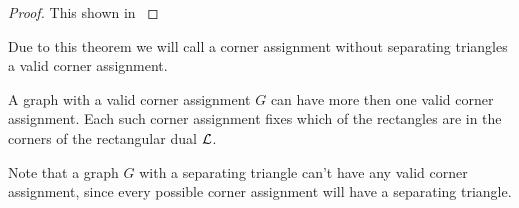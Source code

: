   \begin{proof}
    This shown in \cite{Kozminski1984} 
  \end{proof}

  Due to this theorem we will call a corner assignment without separating triangles a valid corner assignment.

  A graph with a valid corner assignment $G$ can have more then one valid corner assignment. Each such corner assignment fixes which of the rectangles are in the corners of the rectangular dual $\mathcal{L}$.

  Note that a graph $G$ with a separating triangle can't have any valid corner assignment, since every possible corner assignment will have a separating triangle.
